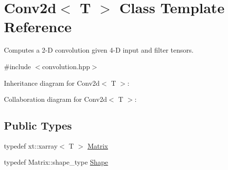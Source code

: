 \hypertarget{class_conv2d}{}\section{Conv2d$<$ T $>$ Class Template Reference}
\label{class_conv2d}


Computes a 2-\/D convolution given 4-\/D input and filter tensors.  




{\ttfamily \#include $<$convolution.\+hpp$>$}



Inheritance diagram for Conv2d$<$ T $>$\+:


Collaboration diagram for Conv2d$<$ T $>$\+:
\subsection*{Public Types}
\begin{DoxyCompactItemize}
\item 
typedef xt\+::xarray$<$ T $>$ \mbox{\hyperlink{class_conv2d_a8263e2f2c46243e39fbca5712603c0fd}{Matrix}}
\item 
typedef Matrix\+::shape\+\_\+type \mbox{\hyperlink{class_conv2d_a78480f9c798b598a0bda9eadb1731225}{Shape}}
\end{DoxyCompactItemize}
